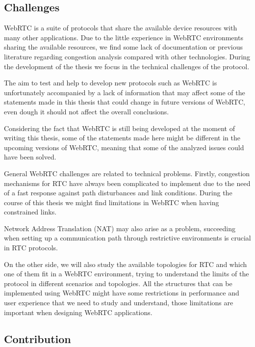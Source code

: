 \subsection{Challenges}

WebRTC is a suite of protocols that share the available device resources with many other applications. Due to the little experience in WebRTC environments sharing the available resources, we find some lack of documentation or previous literature regarding congestion analysis compared with other technologies. During the development of the thesis we focus in the technical challenges of the protocol.

The aim to test and help to develop new protocols such as WebRTC is unfortunately accompanied by a lack of information that may affect some of the statements made in this thesis that could change in future versions of WebRTC, even dough it should not affect the overall conclusions.

Considering the fact that WebRTC is still being developed at the moment of writing this thesis, some of the statements made here might be different in the upcoming versions of WebRTC, meaning that some of the analyzed issues could have been solved.

General WebRTC challenges are related to technical problems. Firstly, congestion mechanisms for RTC have always been complicated to implement due to the need of a fast response against path disturbances and link conditions. During the course of this thesis we might find limitations in WebRTC when having constrained links.

Network Address Translation (NAT)  may also arise as a problem, succeeding when setting up a communication path through restrictive environments is crucial in RTC protocols.

On the other side, we will also study the available topologies for RTC and which one of them fit in a WebRTC environment, trying to understand the limits of the protocol in different scenarios and topologies. All the structures that can be implemented using WebRTC might have some restrictions in performance and user experience that we need to study and understand, those limitations are important when designing WebRTC applications.

\subsection{Contribution}

